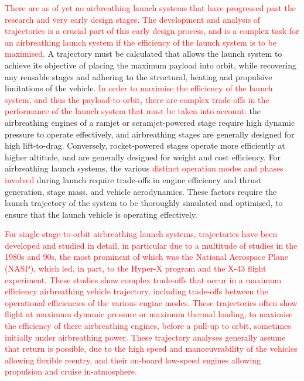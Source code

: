   	\textcolor{red}{There are as of yet no airbreathing launch systems that have progressed past the research and very early design stages\cite{Argus,Powell1991,Trefny1999,Roche2000,Pescetelli2012,Young2006,Bradford2000,Hyperion,Wilhite1991,Fujikawa2017,Mehta2001,Takahashi1997,Aberleen,Germain2001,Eklund2012,Bradford2002,Kimura1999,Preller2018a}. The development and analysis of trajectories is a crucial part of this early design process, and is a complex task for an airbreathing launch system if the efficiency of the launch system is to be maximised.}
  	 A trajectory must be calculated that allows the launch system to achieve its objective of placing the maximum payload into orbit, while recovering any reusable stages and adhering to the structural, heating and propulsive limitations of the vehicle\cite{Bulirsch1995}.  
  	\textcolor{red}{ In order to maximise the efficiency of the launch system, and thus the payload-to-orbit, there are complex trade-offs in the performance of the launch system that must be taken into account:} the airbreathing engines of a ramjet or scramjet-powered stage require high dynamic pressure to operate effectively, and airbreathing stages are generally designed for high lift-to-drag. Conversely, rocket-powered stages operate more efficiently at higher altitude, and are generally designed for weight and cost efficiency. For airbreathing launch systems, the various \textcolor{red}{distinct operation modes and phases involved} during launch require trade-offs in engine efficiency and thrust generation, stage mass, and vehicle aerodynamics. These factors require the launch trajectory of the system to be thoroughly simulated and optimised, to ensure that the launch vehicle is operating effectively. 
  	 
  
  	 \textcolor{red}{
  	   For single-stage-to-orbit airbreathing launch systems, trajectories have been developed and studied in detail\cite{Argus,Powell1991,Trefny1999,Roche2000,Pescetelli2012,Young2006,Bradford2000,Hyperion}, in particular due to a multitude of studies in the 1980s and 90s, the most prominent of which was the National Aerospace Plane (NASP), which led, in part, to the Hyper-X program and the X-43 flight experiment\cite{Mcclinton2008}. These studies show complex trade-offs that occur in a maximum efficiency airbreathing vehicle trajectory, including trade-offs between the operational efficiencies of the various engine modes. These trajectories often show flight at maximum dynamic pressure or maximum thermal loading, to maximise the efficiency of there airbreathing engines, before a pull-up to orbit, sometimes initially under airbreathing power. These trajectory analyses generally assume that return is possible, due to the high speed and manoeuvrability of the vehicles allowing flexible reentry, and their on-board low-speed engines allowing propulsion and cruise in-atmosphere. 
  	}
  	

